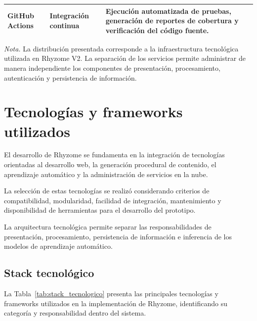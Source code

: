 \begin{table}[htbp]
\begin{tabularx}{\textwidth}{
			|>{\raggedright\arraybackslash}p{3cm}|
			>{\raggedright\arraybackslash}p{3cm}|
			>{\raggedright\arraybackslash}X|
		}
		\hline
		
		\textbf{GitHub Actions} &
		Integración continua &
		Ejecución automatizada de pruebas, generación de reportes de cobertura y verificación del código fuente. \\
		
		\hline
		
	\end{tabularx}
	
	\par\smallskip
	\raggedright
	
	\textit{Nota.} La distribución presentada corresponde a la infraestructura tecnológica utilizada en Rhyzome V2. La separación de los servicios permite administrar de manera independiente los componentes de presentación, procesamiento, autenticación y persistencia de información.
	
\end{table}

\FloatBarrier

\section{Tecnologías y frameworks utilizados}
\label{sec:tecnologias_frameworks}

El desarrollo de Rhyzome se fundamenta en la integración de tecnologías orientadas al desarrollo web, la generación procedural de contenido, el aprendizaje automático y la administración de servicios en la nube.

La selección de estas tecnologías se realizó considerando criterios de compatibilidad, modularidad, facilidad de integración, mantenimiento y disponibilidad de herramientas para el desarrollo del prototipo.

La arquitectura tecnológica permite separar las responsabilidades de presentación, procesamiento, persistencia de información e inferencia de los modelos de aprendizaje automático.

\subsection{Stack tecnológico}

La Tabla~\ref{tab:stack_tecnologico} presenta las principales tecnologías y frameworks utilizados en la implementación de Rhyzome, identificando su categoría y responsabilidad dentro del sistema.

